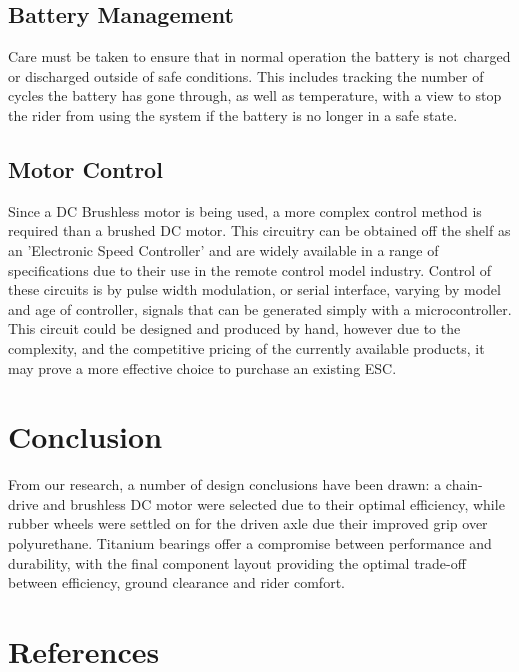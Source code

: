 \documentclass[journal,10pt]{IEEEtran}
\begin{document}
    \subsection{Battery Management}
    	Care must be taken to ensure that in normal operation the battery is not charged or discharged outside of safe conditions.
    	This includes tracking the number of cycles the battery has gone through, as well as temperature, with a view to stop the rider from using the system if the battery is no longer in a safe state.
    	
    \subsection{Motor Control}
    		Since a DC Brushless motor is being used, a more complex control method is required than a brushed DC motor.
    		This circuitry can be obtained off the shelf as an 'Electronic Speed Controller' and are widely available in a range of specifications due to their use in the remote control model industry.
    		Control of these circuits is by pulse width modulation, or serial interface, varying by model and age of controller, signals that can be generated simply with a microcontroller.
    		This circuit could be designed and produced by hand, however due to the complexity, and the competitive pricing of the currently available products, it may prove a more effective choice to purchase an existing ESC.
\section{Conclusion}
From our research, a number of design conclusions have been drawn: a chain-drive and brushless DC motor were selected due to their optimal efficiency, while rubber wheels were settled on for the driven axle due their improved grip over polyurethane. Titanium bearings offer a compromise between performance and durability, with the final component layout providing the optimal trade-off between efficiency, ground clearance and rider comfort.
\section{References}
\end{document}

